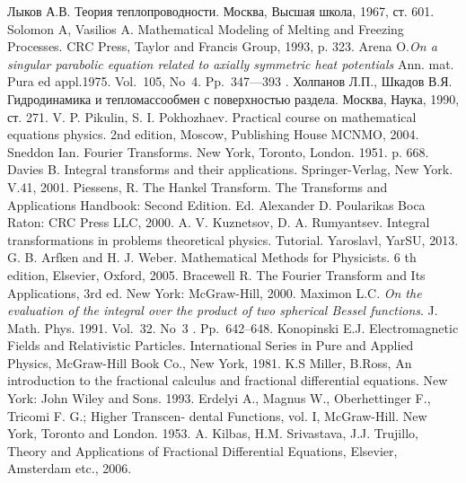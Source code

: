 \begin{thebibliography}{99}
Лыков А.В. Теория теплопроводности. Москва, Высшая школа, 1967, ст. 601.
Solomon A, Vasilios A. Mathematical Modeling of Melting and Freezing Processes. CRC Press, Taylor  and Francis Group, 1993, p. 323.
Arena O.{\it On a singular parabolic equation related to axially symmetric heat potentials}  Ann. mat. Pura ed appl.1975.  Vol.~105, No~4. Pp.~347—393 .
Холпанов Л.П., Шкадов В.Я. Гидродинамика и тепломассообмен с поверхностью раздела. Москва, Наука, 1990, ст. 271.
V. P. Pikulin, S. I. Pokhozhaev. Practical course on mathematical equations physics. 2nd edition, Moscow, Publishing House MCNMO, 2004.
Sneddon Ian. Fourier Transforms. New York, Toronto, London. 1951. p. 668.
Davies B. Integral transforms and their applications. Springer-Verlag, New York. V.41, 2001.
Piessens, R. The Hankel Transform. The Transforms and Applications Handbook: Second Edition. Ed. Alexander D. Poularikas Boca Raton: CRC Press LLC, 2000.
A. V. Kuznetsov, D. A. Rumyantsev. Integral transformations in problems theoretical physics. Tutorial. Yaroslavl, YarSU, 2013.
G. B. Arfken and H. J. Weber. Mathematical Methods for Physicists. 6 th edition, Elsevier, Oxford, 2005.
Bracewell R. The Fourier Transform and Its Applications, 3rd ed. New York: McGraw-Hill, 2000.
Maximon L.C. {\it On the evaluation of the integral over the product of two spherical Bessel functions}. J. Math. Phys. 1991. Vol.~32. No~3 . Pp.~642–648.
Konopinski E.J. Electromagnetic Fields and Relativistic Particles. International Series in Pure and Applied Physics, McGraw-Hill Book Co., New York, 1981.
K.S Miller, B.Ross, An introduction to the fractional calculus and fractional differential equations. New York: John Wiley and Sons. 1993.
Erdelyi A., Magnus W., Oberhettinger F., Tricomi F. G.; Higher Transcen-
dental Functions, vol. I, McGraw-Hill. New York, Toronto and London.  1953.
A. Kilbas, H.M. Srivastava, J.J. Trujillo, Theory and Applications of Fractional Differential Equations, Elsevier, Amsterdam etc., 2006.


\end{thebibliography}

  



%

